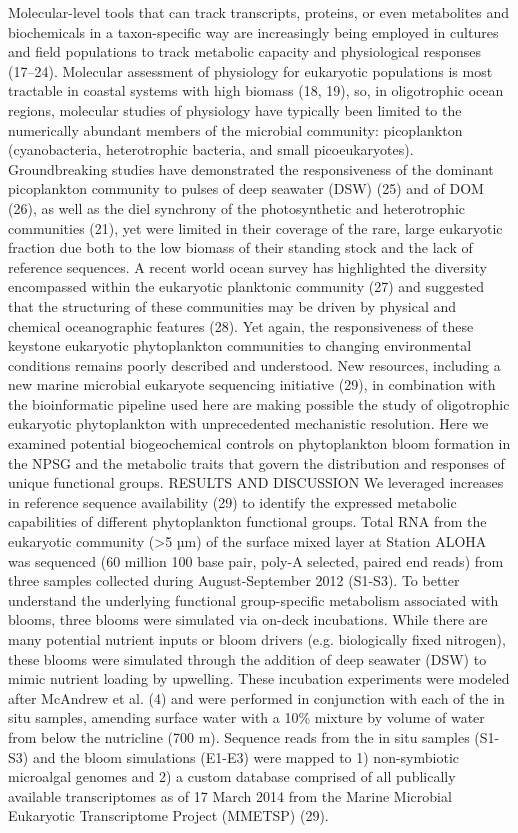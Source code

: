 Molecular-level tools that can track transcripts, proteins, or even metabolites and biochemicals in a taxon-specific way are increasingly being employed in cultures and field populations to track metabolic capacity and physiological responses (17–24). Molecular assessment of physiology for eukaryotic populations is most tractable in coastal systems with high biomass (18, 19), so, in oligotrophic ocean regions, molecular studies of physiology have typically been limited to the numerically abundant members of the microbial community: picoplankton (cyanobacteria, heterotrophic bacteria, and small picoeukaryotes). Groundbreaking studies have demonstrated the responsiveness of the dominant picoplankton community to pulses of deep seawater (DSW) (25) and of DOM (26), as well as the diel synchrony of the photosynthetic and heterotrophic communities (21), yet were limited in their coverage of the rare, large eukaryotic fraction due both to the low biomass of their standing stock and the lack of reference sequences. A recent world ocean survey has highlighted the diversity encompassed within the eukaryotic planktonic community (27) and suggested that the structuring of these communities may be driven by physical and chemical oceanographic features (28). Yet again, the responsiveness of these keystone eukaryotic phytoplankton communities to changing environmental conditions remains poorly described and understood. 
New resources, including a new marine microbial eukaryote sequencing initiative (29), in combination with the bioinformatic pipeline used here are making possible the study of oligotrophic eukaryotic phytoplankton with unprecedented mechanistic resolution. Here we examined potential biogeochemical controls on phytoplankton bloom formation in the NPSG and the metabolic traits that govern the distribution and responses of unique functional groups.
RESULTS AND DISCUSSION
We leveraged increases in reference sequence availability (29) to identify the expressed metabolic capabilities of different phytoplankton functional groups. Total RNA from the eukaryotic community (>5 µm) of the surface mixed layer at Station ALOHA was sequenced (60 million 100 base pair, poly-A selected, paired end reads) from three samples collected during August-September 2012 (S1-S3). To better understand the underlying functional group-specific metabolism associated with blooms, three blooms were simulated via on-deck incubations. While there are many potential nutrient inputs or bloom drivers (e.g. biologically fixed nitrogen), these blooms were simulated through the addition of deep seawater (DSW) to mimic nutrient loading by upwelling.  These incubation experiments were modeled after McAndrew et al. (4) and were performed in conjunction with each of the in situ samples, amending surface water with a 10\% mixture by volume of water from below the nutricline (700 m). Sequence reads from the in situ samples (S1-S3) and the bloom simulations (E1-E3) were mapped to 1) non-symbiotic microalgal genomes and 2) a custom database comprised of all publically available transcriptomes as of 17 March 2014 from the Marine Microbial Eukaryotic Transcriptome Project (MMETSP) (29). 
